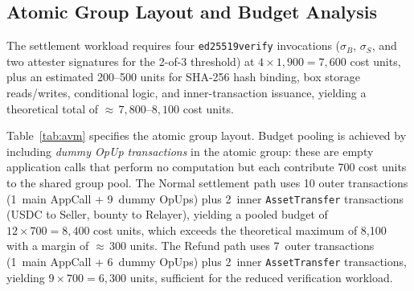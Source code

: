 \documentclass[journal]{IEEEtran}
\begin{document}
\subsection{Atomic Group Layout and Budget Analysis}

The settlement workload requires four \texttt{ed25519verify}
invocations ($\sigma_B$, $\sigma_S$, and two attester signatures
for the 2-of-3 threshold) at
$4 \times 1{,}900 = 7{,}600$ cost units, plus an estimated
200--500 units for SHA-256 hash binding, box storage reads/writes,
conditional logic, and inner-transaction issuance, yielding a
theoretical total of ${\approx}\,7{,}800$--$8{,}100$ cost units.

Table~\ref{tab:avm} specifies the atomic group layout.
Budget pooling is achieved by including \emph{dummy OpUp
transactions} in the atomic group: these are empty application calls
that perform no computation but each contribute 700 cost units to
the shared group pool.
The Normal settlement path uses 10 outer transactions
(1~main AppCall + 9~dummy OpUps) plus 2~inner
\texttt{AssetTransfer} transactions (USDC to Seller, bounty to
Relayer), yielding a pooled budget of
$12 \times 700 = 8{,}400$ cost units, which exceeds the theoretical
maximum of 8{,}100 with a margin of ${\approx}\,300$ units.
The Refund path uses 7~outer transactions (1~main AppCall +
6~dummy OpUps) plus 2~inner \texttt{AssetTransfer} transactions,
yielding $9 \times 700 = 6{,}300$ units, sufficient for the reduced
verification workload.

\begin{table}[h]
\centering
\caption{Atomic group layout and cost budget (Terminal phase)}
\label{tab:avm}
\end{table}
\end{document}
